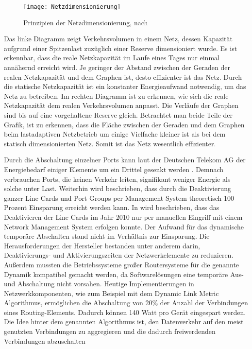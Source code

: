 \begin{figure}[!ht]
	\centering
	\texttt{[image: Netzdimensionierung]}
	\caption{Prinzipien der Netzdimensionierung, nach \cite{fisher}}
	\label{fig:Netzdimensionierung}
\end{figure}

Das linke Diagramm  zeigt Verkehrsvolumen in einem Netz, dessen Kapazität aufgrund einer Spitzenlast zuzüglich einer Reserve dimensioniert wurde. Es ist erkennbar, dass die reale Netzkapazität im Laufe eines Tages nur einmal annähernd erreicht wird. Je geringer der Abstand zwischen der Geraden der realen Netzkapazität und dem Graphen ist, desto effizienter ist das Netz. Durch die statische Netzkapazität ist ein konstanter Energieaufwand notwendig, um das Netz zu betreiben. 
Im rechten Diagramm  ist zu erkennen, wie sich die reale Netzkapazität dem realen Verkehrsvolumen anpasst. Die Verläufe der Graphen sind bis auf eine vorgehaltene Reserve gleich. Betrachtet man beide Teile der Grafik, ist zu erkennen, dass die Fläche zwischen der Geraden und dem Graphen beim lastadaptiven Netzbetrieb um einige Vielfache kleiner ist als bei dem statisch dimensionierten Netz. Somit ist das Netz wesentlich effizienter.

Durch die Abschaltung einzelner Ports kann laut der Deutschen Telekom AG der Energiebedarf einiger Elemente um ein Drittel gesenkt werden \cite[4]{lange}. Demnach verbrauchen Ports, die keinen Verkehr leiten, signifikant weniger Energie als solche unter Last. Weiterhin wird beschrieben, dass durch die Deaktivierung ganzer Line Cards und Port Groups per Management System theoretisch 100 Prozent Einsparung erreicht werden kann. In  \cite{lange} wird beschrieben, dass das Deaktivieren der Line Cards im Jahr 2010 nur per manuellen Eingriff mit einem Network Management System erfolgen konnte. Der Aufwand für das dynamische temporäre Abschalten stand  nicht im Verhältnis zur Einsparung. Die Herausforderungen der Hersteller bestanden unter anderem darin, Deaktivierungs- und Aktivierungszeiten der Netzwerkelemente zu reduzieren. Außerdem mussten die Betriebssysteme großer Routersysteme für die genannte Dynamik kompatibel gemacht werden, da Softwarelösungen eine temporäre Aus- und Abschaltung nicht vorsahen.
Heutige Implementierungen in Netzwerkkomponenten, wie zum Beispiel mit dem Dynamic Link Metric Algorithmus, ermöglichen die Abschaltung von 20\% der Anzahl der Verbindungen eines Routing-Elements. Dadurch können 140 Watt pro Gerät eingespart werden\cite{keiouniversity}. Die Idee hinter dem genannten Algorithmus ist, den Datenverkehr auf den meist genutzten Verbindungen zu aggregieren und die dadurch freiwerdenden Verbindungen abzuschalten\cite[592]{survey2013} 


